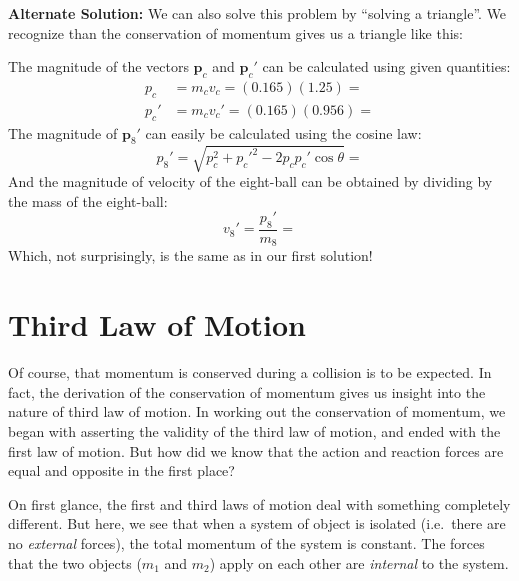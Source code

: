 \begin{example}
  \textbf{Alternate Solution:} We can also solve this problem by
  ``solving a triangle''. We recognize than the conservation of momentum
  gives us a triangle like this:
  \begin{center}
  \end{center}
  The magnitude of the vectors $\bm p_c$ and $\bm p_c'$ can be calculated
  using given quantities:
  \begin{align*}
    p_c & = m_cv_c=(0.165)(1.25)=\\
    p_c' & = m_cv_c'=(0.165)(0.956)=
  \end{align*}
  The magnitude of $\bm p_8'$ can easily be calculated using the cosine law:
  \begin{displaymath}
    p_8'=\sqrt{p_c^2+p_c'^2-2p_cp_c'\cos\theta}=
  \end{displaymath}
  And the magnitude of velocity of the eight-ball can be obtained by dividing by
  the mass of the eight-ball:
  \begin{displaymath}
    v_8'=\frac{p_8'}{m_8}=
  \end{displaymath}
  Which, not surprisingly, is the same as in our first solution!
\end{example}



\section{Third Law of Motion}

Of course, that momentum is conserved during a collision is to be expected. In
fact, the derivation of the conservation of momentum gives us insight into the
nature of third law of motion. In working out the conservation of momentum, we
began with asserting the validity of the third law of motion, and ended with
the first law of motion. But how did we know that the action and reaction
forces are equal and opposite in the first place?

On first glance, the first and third laws of motion deal with something
completely different. But here, we see that when a system of object is isolated
(i.e.\ there are no \emph{external} forces), the total momentum of the system is
constant. The forces that the two objects ($m_1$ and $m_2$) apply on each other
are \emph{internal} to the system.

